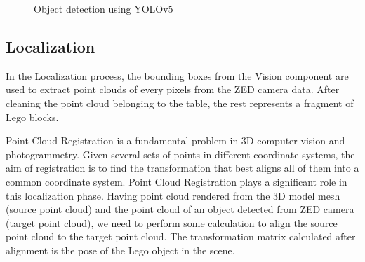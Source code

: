 \documentclass{article}
\begin{document}
	\begin{figure}[H]
		\centering
		\caption{Object detection using YOLOv5}
		\label{fig:detect}
	\end{figure}
	
	\subsection{Localization}
	In the Localization process, the bounding boxes from the Vision component are used to extract point clouds of every pixels from the ZED camera data. After cleaning the point cloud belonging to the table, the rest represents a fragment of Lego blocks.
	
	\begin{figure}[H]
		\centering
		\label{fig:pointcloud-clean}
	\end{figure}
	
	Point Cloud Registration is a fundamental problem in 3D computer vision and photogrammetry. Given several sets of points in different coordinate systems, the aim of registration is to find the transformation that best aligns all of them into a common coordinate system. Point Cloud Registration plays a significant role in this localization phase. Having point cloud rendered from the 3D model mesh (source point cloud) and the point cloud of an object detected from ZED camera (target point cloud), we need to perform some calculation to align the source point cloud to the target point cloud. The transformation matrix calculated after alignment is the pose of the Lego object in the scene.
	
\end{document}
